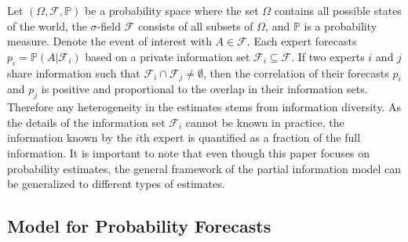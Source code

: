\documentclass[11pt,twoside]{article}
\renewcommand{\P}{\mathbb{P}}
\begin{document}
Let  $(\Omega, \mathcal{F}, \P)$ be a probability space where the set $\Omega$ contains all possible states of the world, the $\sigma$-field $\mathcal{F}$ consists of all subsets of $\Omega$, and $\P$ is a probability measure. Denote the event of interest with $A \in \mathcal{F}$. 
 Each expert forecasts $p_i = \P\left(A | \mathcal{F}_i\right)$ based on a private information set $\mathcal{F}_i \subseteq \mathcal{F}$. 
If two experts $i$ and $j$ share information such that $\mathcal{F}_i \cap \mathcal{F}_j \neq \emptyset$, then the correlation of their forecasts $p_i$ and $p_j$ is positive and proportional to the overlap in their information sets. Therefore any heterogeneity in the estimates stems from information diversity. As the details of the information set $\mathcal{F}_i$ cannot be known in practice, the information known by the $i$th expert is quantified as a fraction of the full information. It is important to note that even though this paper focuses on probability estimates, the general framework of the partial information model can be  generalized to different types of estimates. 

\subsection{Model for Probability Forecasts}
\label{Model}
\end{document}
